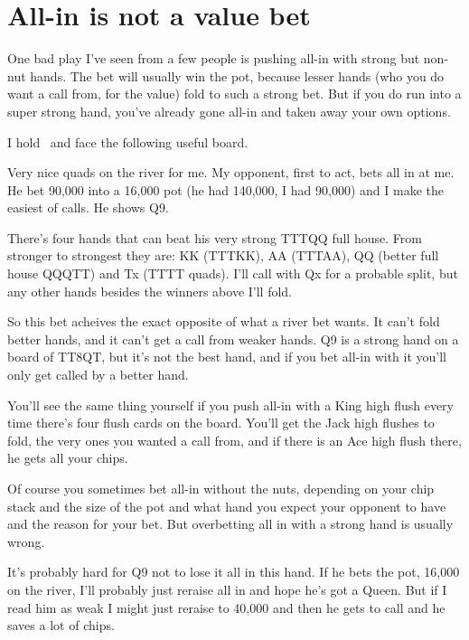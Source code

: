\chapter{All-in is not a value bet}



One bad play I've seen from a few people is pushing all-in
with strong but non-nut hands. The bet will usually win the
pot, because lesser hands (who you do want a call from, for the
value) fold to such a strong bet. But if you do run
into a super strong hand, you've already gone all-in and taken
away your own options.

I hold \Jh\tens\ and face the following useful board.

\begin{cards}
\crdtenh\crdtenc\crdeigh\crdQd\crdtend%
\end{cards}

Very nice quads on the river for me. My opponent, first to act, bets
all in at me. He bet 90,000 into a 16,000 pot (he had 140,000, I had
90,000) and I make the easiest of calls. He shows Q9.

There's four hands that can beat his very strong TTTQQ full house.
From stronger to strongest they are: KK (TTTKK), AA (TTTAA), QQ
(better full house QQQTT) and Tx (TTTT quads). I'll call with Qx for a
probable split, but any other hands besides the winners above I'll
fold.

So this bet acheives the exact opposite of what a river bet wants.
It can't fold better hands, and it can't get a call from weaker hands.
Q9 is a strong hand on a board of TT8QT, but it's not the best hand,
and if you bet all-in with it you'll only get called by a better hand.

You'll see the same thing yourself if you push all-in with a King
high flush every time there's four flush cards on the board.
You'll get the Jack high flushes to fold, the very ones you
wanted a call from, and if there is an Ace high flush there,
he gets all your chips.

Of course you sometimes bet all-in without the nuts, depending on
your chip stack and the size of the pot and what hand you expect
your opponent to have and the reason for your bet. But overbetting
all in with a strong hand is usually wrong.

It's probably hard for Q9 not to lose it all in this hand. If he bets
the pot, 16,000 on the river, I'll probably just reraise all in and hope
he's got a Queen. But if I read him as weak I might just reraise to
40,000 and then he gets to call and he saves a lot of chips.

